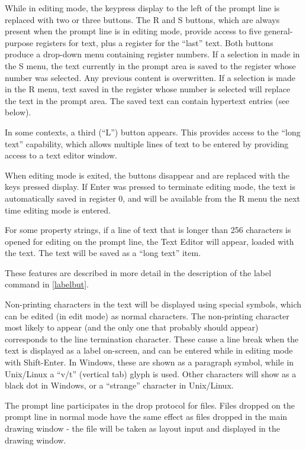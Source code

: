 While in editing mode, the keypress display to the left of the prompt
line is replaced with two or three buttons.  The {\cb R} and {\cb S}
buttons, which are always present when the prompt line is in editing
mode, provide access to five general-purpose registers for text, plus
a register for the ``last'' text.  Both buttons produce a drop-down
menu containing register numbers.  If a selection in made in the {\cb
S} menu, the text currently in the prompt area is saved to the
register whose number was selected.  Any previous content is
overwritten.  If a selection is made in the {\cb R} menu, text saved
in the register whose number is selected will replace the text in the
prompt area.  The saved text can contain hypertext entries (see
below).

In some contexts, a third (``{\cb L}'') button appears.  This provides
access to the ``long text'' capability, which allows multiple lines of
text to be entered by providing access to a text editor window.

When editing mode is exited, the buttons disappear and are replaced
with the keys pressed display.  If {\kb Enter} was pressed to
terminate editing mode, the text is automatically saved in register 0,
and will be available from the {\cb R} menu the next time editing mode
is entered.

For some property strings, if a line of text that is longer than 256
characters is opened for editing on the prompt line, the {\cb Text
Editor} will appear, loaded with the text.  The text will be saved as
a ``long text'' item.

These features are described in more detail in the description of
the {\cb label} command in \ref{labelbut}.

Non-printing characters in the text will be displayed using special
symbols, which can be edited (in edit mode) as normal characters.  The
non-printing character most likely to appear (and the only one that
probably should appear) corresponds to the line termination character. 
These cause a line break when the text is displayed as a label
on-screen, and can be entered while in editing mode with {\kb
Shift-Enter}.  In Windows, these are shown as a paragraph symbol,
while in Unix/Linux a ``v/t'' (vertical tab) glyph is used.  Other
characters will show as a black dot in Windows, or a ``strange''
character in Unix/Linux.

The prompt line participates in the drop protocol for files.  Files
dropped on the prompt line in normal mode have the same effect as
files dropped in the main drawing window - the file will be taken as
layout input and displayed in the drawing window.

